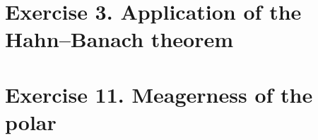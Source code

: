 %
\setcounter{section}{2}
%
\section{Exercise 3. Application of the Hahn--Banach theorem}
 
%
\setcounter{section}{10}
%
\section{Exercise 11. Meagerness of the polar}

